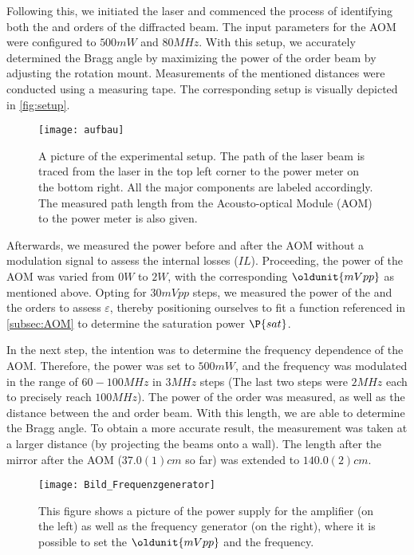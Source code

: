 Following this, we initiated the laser and commenced the process of identifying both the  and  orders of the diffracted beam. The input parameters for the AOM were configured to $500 \unit{mW}$ and $80 \unit{MHz}$. With this setup, we accurately determined the Bragg angle by maximizing the power of the  order beam by adjusting the rotation mount. Measurements of the mentioned distances were conducted using a measuring tape. The corresponding setup is visually depicted in \autoref{fig:setup}.
\begin{figure}[H]
	\centering
	\texttt{[image: aufbau]}
	\caption{A picture of the experimental setup. The path of the laser beam is traced from the laser in the top left corner to the power meter on the bottom right. All the major components are labeled accordingly. The measured path length from the Acousto-optical Module (AOM) to the power meter is also given.}
	\label{fig:setup}
\end{figure}
Afterwards, we measured the power before and after the AOM without a modulation signal to assess the internal losses ($IL$). Proceeding, the power of the AOM was varied from $0 \unit{W}$ to $2 \unit{W}$, with the corresponding $\oldunit{mVpp}$ as mentioned above. Opting for $30 \unit{mVpp}$ steps, we measured the power of the  and the  orders to assess $\varepsilon$, thereby positioning ourselves to fit a function referenced in \autoref{subsec:AOM} to determine the saturation power $\P{sat}$.

In the next step, the intention was to determine the frequency dependence of the AOM. Therefore, the power was set to $500 \unit{mW}$, and the frequency was modulated in the range of $60 - 100 \unit{MHz}$ in $3 \unit{MHz}$ steps (The last two steps were $2 \unit{MHz}$ each to precisely reach $100 \unit{MHz}$). The power of the  order was measured, as well as the distance between the  and  order beam. With this length, we are able to determine the Bragg angle. To obtain a more accurate result, the measurement was taken at a larger distance (by projecting the beams onto a wall). The length after the  mirror after the AOM ($37.0(1) \unit{cm}$ so far) was extended to $140.0(2) \unit{cm}$.

\begin{figure}[H]
	\centering
	\texttt{[image: Bild\_Frequenzgenerator]}
	\caption{This figure shows a picture of the power supply for the amplifier (on the left) as well as the frequency generator (on the right), where it is possible to set the $\oldunit{mVpp}$ and the frequency.}
	\label{fig:Frequnezgenerator}
\end{figure}

